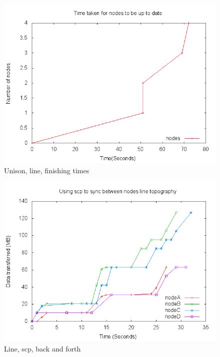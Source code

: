 \documentclass[12pt]{article}
\begin{document}
\begin{figure}[htp]
    \centering
    \includegraphics[scale=0.5]{images/fintime.png}
    \caption{Unison, line, finishing times}
    \label{fig:fintime_graph}
\end{figure}

\begin{figure}[htp]
    \centering
    \includegraphics[scale=0.5]{images/line-scp-back.png}
    \caption{Line, scp, back and forth}
    \label{fig:line_scp_back_forth_graph}
\end{figure}
\end{document}
